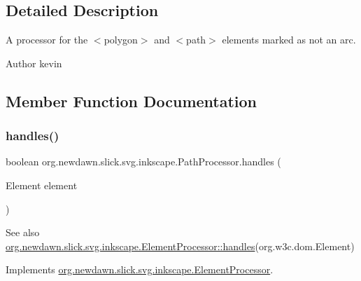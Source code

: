 \subsection{Detailed Description}
A processor for the $<$polygon$>$ and $<$path$>$ elements marked as not an arc.

\begin{DoxyAuthor}{Author}
kevin 
\end{DoxyAuthor}


\subsection{Member Function Documentation}
\mbox{\label{classorg_1_1newdawn_1_1slick_1_1svg_1_1inkscape_1_1_path_processor_a0dda8e99a9e32cfa07593e50537be812}} 
\subsubsection{\texorpdfstring{handles()}{handles()}}
{\footnotesize\ttfamily boolean org.\+newdawn.\+slick.\+svg.\+inkscape.\+Path\+Processor.\+handles (\begin{DoxyParamCaption}\item[{Element}]{element }\end{DoxyParamCaption})\hspace{0.3cm}{\ttfamily [inline]}}

\begin{DoxySeeAlso}{See also}
\mbox{\hyperlink{interfaceorg_1_1newdawn_1_1slick_1_1svg_1_1inkscape_1_1_element_processor_ae95bbf21a67c52aff02cf09259c554a3}{org.\+newdawn.\+slick.\+svg.\+inkscape.\+Element\+Processor\+::handles}}(org.\+w3c.\+dom.\+Element) 
\end{DoxySeeAlso}


Implements \mbox{\hyperlink{interfaceorg_1_1newdawn_1_1slick_1_1svg_1_1inkscape_1_1_element_processor_ae95bbf21a67c52aff02cf09259c554a3}{org.\+newdawn.\+slick.\+svg.\+inkscape.\+Element\+Processor}}.


